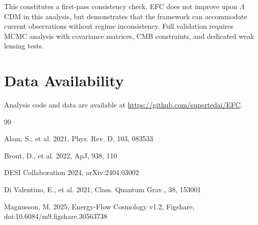 \documentclass[12pt,a4paper]{article}
\begin{document}
This constitutes a first-pass consistency check. EFC does not improve upon $\Lambda$CDM 
in this analysis, but demonstrates that the framework can accommodate current observations 
without regime inconsistency. Full validation requires MCMC analysis with covariance 
matrices, CMB constraints, and dedicated weak lensing tests.

\section*{Data Availability}

Analysis code and data are available at \url{https://github.com/supertedai/EFC}.

\begin{thebibliography}{99}

Alam, S., et al. 2021, Phys. Rev. D, 103, 083533

Brout, D., et al. 2022, ApJ, 938, 110

DESI Collaboration 2024, arXiv:2404.03002

Di Valentino, E., et al. 2021, Class. Quantum Grav., 38, 153001

Magnusson, M. 2025, Energy-Flow Cosmology v1.2, Figshare, doi:10.6084/m9.figshare.30563738

\end{thebibliography}
\end{document}
